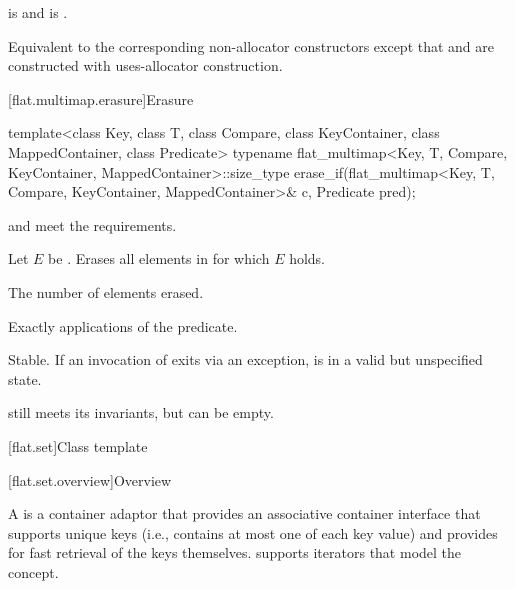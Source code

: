 \begin{itemdescr}
\pnum
\constraints
{} is  and
 is .

\pnum
\effects
Equivalent to the corresponding non-allocator constructors
except that  and  are constructed
with uses-allocator construction.
\end{itemdescr}

[flat.multimap.erasure]{Erasure}

%
\begin{itemdecl}
template<class Key, class T, class Compare, class KeyContainer, class MappedContainer,
         class Predicate>
  typename flat_multimap<Key, T, Compare, KeyContainer, MappedContainer>::size_type
    erase_if(flat_multimap<Key, T, Compare, KeyContainer, MappedContainer>& c, Predicate pred);
\end{itemdecl}

\begin{itemdescr}
\pnum
\expects
{} and  meet the  requirements.

\pnum
\effects
Let $E$ be .
Erases all elements  in  for which $E$ holds.

\pnum
\returns
The number of elements erased.

\pnum
\complexity
Exactly  applications of the predicate.

\pnum
\remarks
Stable.
If an invocation of  exits via an exception,
 is in a valid but unspecified state.
\begin{note}
 still meets its invariants,
but can be empty.
\end{note}
\end{itemdescr}

[flat.set]{Class template }

[flat.set.overview]{Overview}

\pnum
{}%
A  is a container adaptor
that provides an associative container interface
that supports unique keys
(i.e., contains at most one of each key value) and
provides for fast retrieval of the keys themselves.
 supports iterators that model
the  concept.

